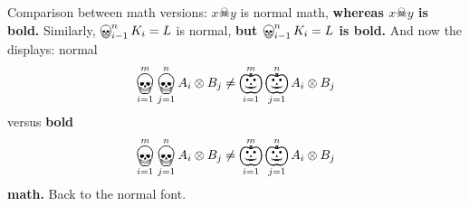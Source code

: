 \documentclass[a4paper]{article}
\begin{document}
Comparison between math versions: $x\skull y$ is normal math,
{\bfseries\boldmath whereas $x\skull y$ is bold.}  Similarly, \(
\bigskull_{i-1}^{n} K_{i} = L \) is normal, {\bfseries\boldmath but \(
\bigskull_{i-1}^{n} K_{i} = L \) is bold.}  And now the displays: normal
\[
	\bigskull_{i=1}^{m}\bigskull_{j=1}^{n} A_{i}\otimes B_{j} \neq
	\bigpumpkin_{i=1}^{m}\bigpumpkin_{j=1}^{n} A_{i}\otimes B_{j}
\]
versus {\bfseries\boldmath bold
\[
	\bigskull_{i=1}^{m}\bigskull_{j=1}^{n} A_{i}\otimes B_{j} \neq
	\bigpumpkin_{i=1}^{m}\bigpumpkin_{j=1}^{n} A_{i}\otimes B_{j}
\]
math.}  Back to the normal font.
\end{document}
